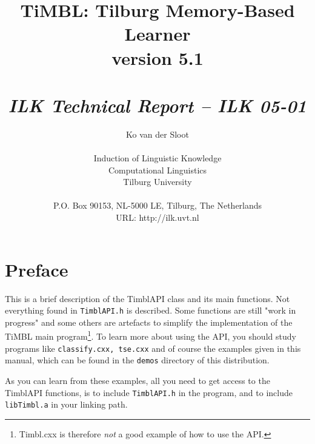 

\parindent 0pt
\parskip 9pt

\newcommand{\chisq}{{$ \chi^2 $}}

\author{Ko van der Sloot\\ \ \\ Induction of Linguistic Knowledge\\
        Computational Linguistics\\ Tilburg University \\ \ \\
        P.O. Box 90153, NL-5000 LE, Tilburg, The Netherlands \\ URL:
        http://ilk.uvt.nl}

\title{{\huge TiMBL: Tilburg Memory-Based Learner} \\ \vspace*{0.5cm}
{\bf version 5.1} \\ \vspace*{0.5cm}{\huge API Reference Guide}\\
\vspace*{1cm} {\it ILK Technical Report -- ILK 05-01}}




\maketitle

\clearpage
\section{Preface}

This is a brief description of the TimblAPI class and its main functions.
Not everything found in {\tt TimblAPI.h} is described. Some functions are
still "work in progress" and some others are artefacts to simplify the
implementation of the TiMBL main program\footnote{Timbl.cxx is
therefore {\em not} a good example of how to use the API.}.
To learn more about using the API, you should study programs like 
{\tt classify.cxx, tse.cxx} and of course the examples given in this
manual, which can be found in the {\tt demos} directory of this
distribution. 

As you can learn from these examples, all you need to get access to the
TimblAPI functions, is to include {\tt TimblAPI.h} in the program, and to
include {\tt libTimbl.a} in your linking path. 

